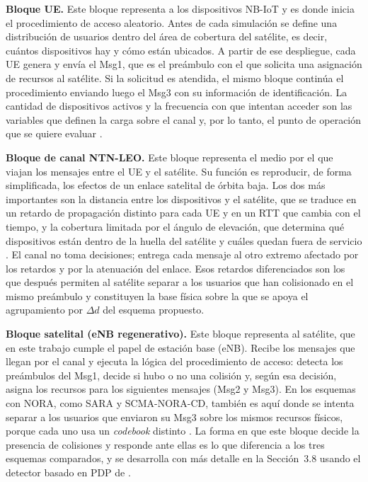 \textbf{Bloque UE.} Este bloque representa a los dispositivos NB-IoT y es donde inicia el procedimiento de acceso aleatorio. Antes de cada simulación se define una distribución de usuarios dentro del área de cobertura del satélite, es decir, cuántos dispositivos hay y cómo están ubicados. A partir de ese despliegue, cada UE genera y envía el Msg1, que es el preámbulo con el que solicita una asignación de recursos al satélite. Si la solicitud es atendida, el mismo bloque continúa el procedimiento enviando luego el Msg3 con su información de identificación. La cantidad de dispositivos activos y la frecuencia con que intentan acceder son las variables que definen la carga sobre el canal y, por lo tanto, el punto de operación que se quiere evaluar \cite{ref5,ref6}.

\textbf{Bloque de canal NTN-LEO.} Este bloque representa el medio por el que viajan los mensajes entre el UE y el satélite. Su función es reproducir, de forma simplificada, los efectos de un enlace satelital de órbita baja. Los dos más importantes son la distancia entre los dispositivos y el satélite, que se traduce en un retardo de propagación distinto para cada UE y en un RTT que cambia con el tiempo, y la cobertura limitada por el ángulo de elevación, que determina qué dispositivos están dentro de la huella del satélite y cuáles quedan fuera de servicio \cite{ref8}. El canal no toma decisiones; entrega cada mensaje al otro extremo afectado por los retardos y por la atenuación del enlace. Esos retardos diferenciados son los que después permiten al satélite separar a los usuarios que han colisionado en el mismo preámbulo y constituyen la base física sobre la que se apoya el agrupamiento por $\Delta d$ del esquema propuesto.

\textbf{Bloque satelital (eNB regenerativo).} Este bloque representa al satélite, que en este trabajo cumple el papel de estación base (eNB). Recibe los mensajes que llegan por el canal y ejecuta la lógica del procedimiento de acceso: detecta los preámbulos del Msg1, decide si hubo o no una colisión y, según esa decisión, asigna los recursos para los siguientes mensajes (Msg2 y Msg3). En los esquemas con NORA, como SARA y SCMA-NORA-CD, también es aquí donde se intenta separar a los usuarios que enviaron su Msg3 sobre los mismos recursos físicos, porque cada uno usa un \textit{codebook} distinto \cite{ref9}. La forma en que este bloque decide la presencia de colisiones y responde ante ellas es lo que diferencia a los tres esquemas comparados, y se desarrolla con más detalle en la Sección~3.8 usando el detector basado en PDP de \cite{ref11}.

